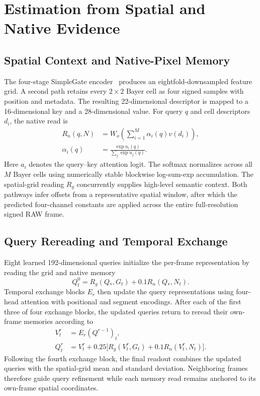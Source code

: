 \section{Estimation from Spatial and Native Evidence}
\label{sec:method}

\subsection{Spatial Context and Native-Pixel Memory}
The four-stage SimpleGate encoder~\cite{naf} produces an eightfold-downsampled feature grid. A second path retains every $2\times2$ Bayer cell as four signed samples with position and metadata. The resulting 22-dimensional descriptor is mapped to a 16-dimensional key and a 28-dimensional value. For query $q$ and cell descriptors $d_i$, the native read is
\begin{equation}
\begin{aligned}
 R_n(q,N)&=W_o\!\left(\sum_{i=1}^{M}\alpha_i(q)v(d_i)\right),\\
 \alpha_i(q)&=\frac{\exp a_i(q)}{\sum_j\exp a_j(q)}.
\end{aligned}\label{eq:read}
\end{equation}
Here $a_i$ denotes the query--key attention logit. The softmax normalizes across all $M$ Bayer cells using numerically stable blockwise log-sum-exp accumulation. The spatial-grid reading $R_g$ concurrently supplies high-level semantic context. Both pathways infer offsets from a representative spatial window, after which the predicted four-channel constants are applied across the entire full-resolution signed RAW frame.

\subsection{Query Rereading and Temporal Exchange}
Eight learned 192-dimensional queries initialize the per-frame representation by reading the grid and native memory
\begin{equation}
 Q_t^0=R_g(Q_*,G_t)+0.1R_n(Q_*,N_t).
 \label{eq:initialread}
\end{equation}
Temporal exchange blocks $E_r$ then update the query representations using four-head attention with positional and segment encodings. After each of the first three of four exchange blocks, the updated queries return to reread their own-frame memories according to
\begin{align}
 V_t^r&=E_r(Q^{r-1})_t,\nonumber\\
 Q_t^r&=V_t^r+0.25\big[R_g(V_t^r,G_t)
                 +0.1R_n(V_t^r,N_t)\big].
 \label{eq:reread}
\end{align}
Following the fourth exchange block, the final readout combines the updated queries with the spatial-grid mean and standard deviation. Neighboring frames therefore guide query refinement while each memory read remains anchored to its own-frame spatial coordinates.

